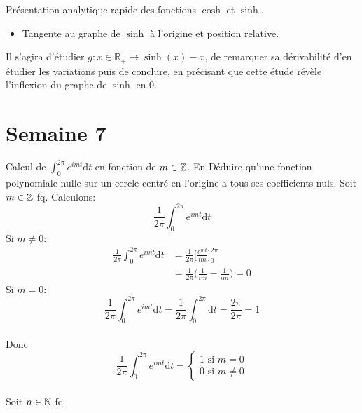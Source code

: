 \documentclass{article}
\renewenvironment{question_kholle}[2][ ]
{
	\subsection{\texorpdfstring{#2}{}}
	\notblank{#1}
	{
		\noindent #1
		\bigbreak
	}
	{}
	\begin{proof}
}
{
	\end{proof}
}
\begin{document}
\begin{question_kholle}{Présentation analytique rapide des fonctions \(\cosh\) et \(\sinh \).}
\begin{itemize}[label=$\bullet$]
		\
		
		\item Tangente au graphe de $\sinh$ à l'origine et position relative.
	\end{itemize}

	Il s'agira d'étudier $g : x\in \mathbb{R}_+ \mapsto \sinh(x) -x$, de remarquer sa dérivabilité d'en étudier les variations puis de conclure, en précisant que cette étude révèle l'inflexion du graphe de $\sinh$ en 0.
\end{question_kholle}

\pagebreak\section{Semaine 7}

\begin{question_kholle}{Calcul de $\int_0^{2\pi}e^{imt} \mathrm d t$ en fonction de $m \in \mathbb Z$. En Déduire qu'une fonction polynomiale nulle sur un cercle centré en l'origine a tous ses coefficients nuls.}
	Soit $m \in \mathbb Z$ fq. Calculons:
	$$\frac{1}{2 \pi} \int_0^{2\pi}e^{imt} \mathrm d t$$
	Si $m \neq 0$:
	\begin{align*}
		\frac{1}{2 \pi} \int_0^{2\pi}e^{imt} \mathrm d t &= \frac{1}{2 \pi} \Big[ \frac{e^{mt}}{im} \Big]_0^{2\pi}\\
		&= \frac{1}{2 \pi} \Big( \frac{1}{im} - \frac{1}{im} \Big) = 0
	\end{align*}
	Si $m = 0$:
	$$
		\frac{1}{2 \pi} \int_0^{2\pi}e^{imt} \mathrm d t = \frac{1}{2 \pi} \int_0^{2\pi} \mathrm d t = \frac{2 \pi}{2 \pi} = 1
	$$
	\\
	Donc $$\frac{1}{2 \pi} \int_0^{2\pi}e^{imt} \mathrm d t = 
	\begin{cases}
		1 \text{ si } m=0\\
		0 \text{ si } m \neq 0
	\end{cases}
	$$
	\\
	Soit $n\in \mathbb N$ fq
	

\end{question_kholle}
\end{document}
